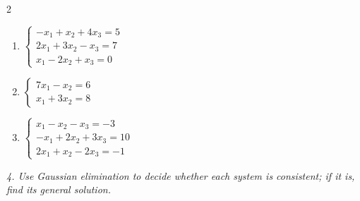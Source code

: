 \begin{multicols}{2}
\begin{enumerate}[label=\arabic*., leftmargin=*]
\item $\begin{cases}-x_1+x_2+4x_3=5\\2x_1+3x_2-x_3=7\\x_1-2x_2+x_3=0\end{cases}$

\item $\begin{cases}7x_1-x_2=6\\x_1+3x_2=8\end{cases}$

\item $\begin{cases}x_1-x_2-x_3=-3\\-x_1+2x_2+3x_3=10\\2x_1+x_2-2x_3=-1\end{cases}$

\end{enumerate}
 \end{multicols}
\emph{4. Use Gaussian elimination to decide whether each system is consistent; if it is, find its general solution.}
\bigskip
